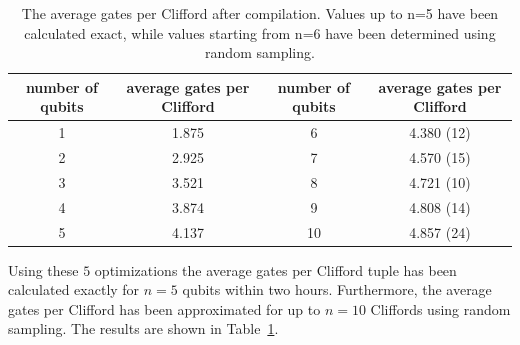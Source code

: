     \begin{table}
      \begin{tabular}{c c || c c}
        \toprule
        number of qubits  & average gates per Clifford & number of qubits  & average gates per Clifford \\
        \midrule
        1 & 1.875 & 6  & 4.380 (12)\\
        2 & 2.925 & 7  & 4.570 (15)\\
        3 & 3.521 & 8  & 4.721 (10)\\
        4 & 3.874 & 9  & 4.808 (14)\\
        5 & 4.137 & 10 & 4.857 (24)\\
        \bottomrule
      \end{tabular}
      \caption{The average gates per Clifford after compilation. Values up to n=5 have been calculated exact, while values starting from n=6 have been determined using random sampling.}
      \label{tab:gates per Clifford}
    \end{table}

    Using these $5$ optimizations the average gates per Clifford tuple has been calculated exactly for $n=5$ qubits within two hours. Furthermore, the average gates per Clifford has been approximated for up to $n=10$ Cliffords using random sampling. The results are shown in Table~\ref{tab:gates per Clifford}.
